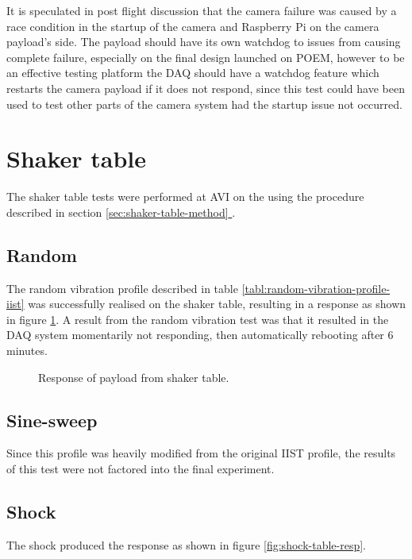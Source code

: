 \documentclass[]{report}
\newcommand*{\secref}[1]{section \hyperref[{#1}]{\ref*{#1} \nameref*{#1}}}
\begin{document}
It is speculated in post flight discussion that the camera failure was caused by a race condition in the startup of the camera and Raspberry Pi on the camera payload's side. The payload should have its own watchdog to issues from causing complete failure, especially on the final design launched on POEM, however to be an effective testing platform the DAQ should have a watchdog feature which restarts the camera payload if it does not respond, since this test could have been used to test other parts of the camera system had the startup issue not occurred.

\section{Shaker table}

The shaker table tests were performed at AVI on the  using the procedure described in \secref{sec:shaker-table-method}.

\subsection{Random}

The random vibration profile described in table \ref{tabl:random-vibration-profile-iist} was successfully realised on the shaker table, resulting in a response as shown in figure \ref{fig:random-table-resp}. A result from the random vibration test was that it resulted in the DAQ system momentarily not responding, then automatically rebooting after 6 minutes.

\begin{figure}[H]
  \centering
  
  \caption{Response of payload from shaker table.}
  \label{fig:random-table-resp}
\end{figure}

\subsection{Sine-sweep}

Since this profile was heavily modified from the original IIST profile, the results of this test were not factored into the final experiment.

\subsection{Shock}

The shock produced the response as shown in figure \ref{fig:shock-table-resp}.
\end{document}
